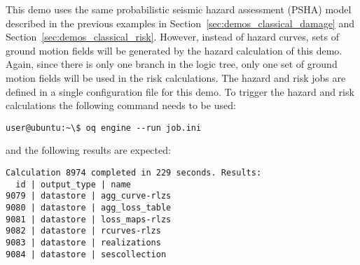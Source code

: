 This demo uses the same probabilistic seismic hazard assessment (PSHA) model
described in the previous examples in Section~\ref{sec:demos_classical_damage}
and Section~\ref{sec:demos_classical_risk}. However, instead of hazard curves,
sets of ground motion fields will be generated by the hazard calculation of
this demo. Again, since there is only one branch in the logic tree, only one
set of ground motion fields will be used in the risk calculations. The hazard
and risk jobs are defined in a single configuration file for this demo. To
trigger the hazard and risk calculations the following command needs to be
used:

\begin{verbatim}
user@ubuntu:~\$ oq engine --run job.ini
\end{verbatim}

and the following results are expected:

\begin{verbatim}
Calculation 8974 completed in 229 seconds. Results:
  id | output_type | name
9079 | datastore | agg_curve-rlzs
9080 | datastore | agg_loss_table
9081 | datastore | loss_maps-rlzs
9082 | datastore | rcurves-rlzs
9083 | datastore | realizations
9084 | datastore | sescollection
\end{verbatim}
